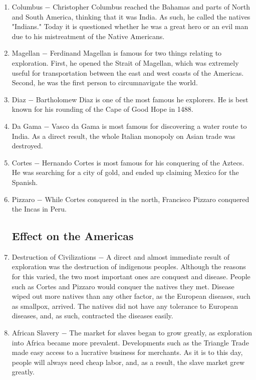 \documentclass[12pt]{article}
\begin{document}
\begin{enumerate}
\item Columbus $-$ Christopher Columbus reached the Bahamas and parts of North and South America, thinking that it was India. As such, he called the natives "Indians." Today it is questioned whether he was a great hero or an evil man due to his mistreatment of the Native Americans.

\item Magellan $-$ Ferdinand Magellan is famous for two things relating to exploration. First, he opened the Strait of Magellan, which was extremely useful for transportation between the east and west coasts of the Americas. Second, he was the first person to circumnavigate the world. 

\item Diaz $-$ Bartholomew Diaz is one of the most famous he explorers. He is best known for his rounding of the Cape of Good Hope in 1488.

\item Da Gama $-$ Vasco da Gama is most famous for discovering a water route to India. As a direct result, the whole Italian monopoly on Asian trade was destroyed.

\item Cortes $-$ Hernando Cortes is most famous for his conquering of the Aztecs. He was searching for a city of gold, and ended up claiming Mexico for the Spanish.

\item Pizzaro $-$ While Cortes conquered in the north, Francisco Pizzaro conquered the Incas in Peru. 

\subsection{Effect on the Americas}

\item Destruction of Civilizations $-$ A direct and almost immediate result of exploration was the destruction of indigenous peoples. Although the reasons for this varied, the two most important ones are conquest and disease. People such as Cortes and Pizzaro would conquer the natives they met. Disease wiped out more natives than any other factor, as the European diseases, such as smallpox, arrived. The natives did not have any tolerance to European diseases, and, as such, contracted the diseases easily. 

\item African Slavery $-$ The market for slaves began to grow greatly, as exploration into Africa became more prevalent. Developments such as the Triangle Trade made easy access to a lucrative business for merchants. As it is to this day, people will always need cheap labor, and, as a result, the slave market grew greatly.


\end{enumerate}
\end{document}
